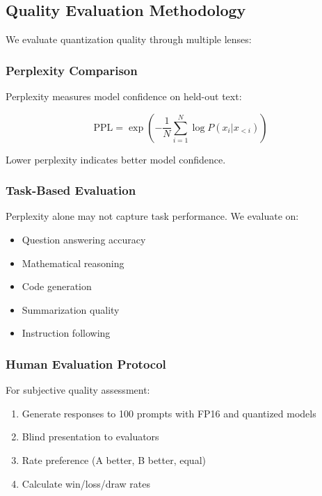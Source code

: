 \subsection{Quality Evaluation Methodology}

We evaluate quantization quality through multiple lenses:

\subsubsection{Perplexity Comparison}

Perplexity measures model confidence on held-out text:

\begin{equation}
\text{PPL} = \exp\left(-\frac{1}{N} \sum_{i=1}^{N} \log P(x_i | x_{<i})\right)
\end{equation}

Lower perplexity indicates better model confidence.

\subsubsection{Task-Based Evaluation}

Perplexity alone may not capture task performance. We evaluate on:

\begin{itemize}
    \item Question answering accuracy
    \item Mathematical reasoning
    \item Code generation
    \item Summarization quality
    \item Instruction following
\end{itemize}

\subsubsection{Human Evaluation Protocol}

For subjective quality assessment:

\begin{enumerate}
    \item Generate responses to 100 prompts with FP16 and quantized models
    \item Blind presentation to evaluators
    \item Rate preference (A better, B better, equal)
    \item Calculate win/loss/draw rates
\end{enumerate}

